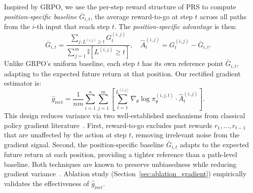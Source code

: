 Inspired by GRPO, we use the per-step reward structure of PRS to compute \emph{position-specific baseline} $\bar{G}_{i,t}$, the average reward-to-go at step $t$ across all paths from the $i$-th input that reach step $t$. The \emph{position-specific advantage} is then:
\begin{equation}
\bar{G}_{i,t} = \frac{\sum_{j: L^{(i,j)} \geq t} G_t^{(i,j)}}{\sum_{j=1}^{m} \mathbb{I}[L^{(i,j)} \geq t]}, \quad \hat{A}_t^{(i,j)} = G_t^{(i,j)} - \bar{G}_{i,t}.
\label{eq:step-advantage}
\end{equation}
Unlike GRPO's uniform baseline, each step $t$ has its own reference point $\bar{G}_{i,t}$, adapting to the expected future return at that position. Our rectified gradient estimator is:
\begin{equation}
\hat{g}_{\mathrm{rect}} = \frac{1}{nm}\sum_{i=1}^{n}\sum_{j=1}^{m}\left[\sum_{t=1}^{L^{(i,j)}} \nabla_\theta \log \pi_\theta^{(i,j,t)} \cdot \hat{A}_t^{(i,j)}\right].
\label{eq:g-rect}
\end{equation}
This design reduces variance via two well-established mechanisms from 
classical policy gradient literature~\citep{Williams92simple,sutton1999policy}. 
First, reward-to-go excludes past rewards $r_1, \ldots, r_{t-1}$ that are unaffected by the action at step $t$, removing irrelevant noise from the gradient signal. Second, the position-specific baseline $\bar{G}_{i,t}$ adapts to the expected future return at each position, providing a tighter reference than a path-level baseline. Both techniques are known to preserve unbiasedness while reducing gradient variance~\citep{GreensmithBB01}. Ablation study (Section~\ref{sec:ablation_gradient}) 
empirically validates the effectiveness of $\hat{g}_{\mathrm{rect}}$.